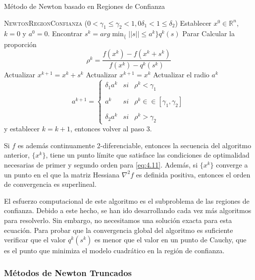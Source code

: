\begin{algorithm}[H]
\caption{Método de Newton basado en Regiones de Confianza}\label{alg:TrustRegionNewton}
\begin{algorithmic}[1]
\Procedure \textsc{NewtonRegionConfianza} ($0<\gamma_1\leq\gamma_2<1, 0 \delta_1 < 1 \leq\delta_2$)
\State Establecer $x^0\in\mathbb{R}^n$, $k=0$ y $a^0=0$.
\State Encontrar $s^k = arg \min_\{||s||\leq a^k\}q^k(s)$
	\State Parar
\Else
	\State Calcular la proporción \begin{equation*}
	\rho^k = \dfrac{f(x^k)-f(x^k+s^k)}{f(x^k)-q^k(s^k)}
	\end{equation*}
		\State Actualizar $x^{k+1}=x^k + s^k$
	\Else
		\State Actualizar $x^{k+1} = x^k$
	\EndIf
	\State Actualizar el radio $a^k$
	\begin{equation*}
	a^{k+1} = \left\{ \begin{array}{lcc}
             \delta_1a^k &   si  & \rho^k < \gamma_1 \\
             \\ a^k &  si & \rho^k\in\in [\gamma_1,\gamma_2] \\
             \\ \delta_2a^k & si & \rho^k > \gamma_2
             \end{array}
   \right.
	\end{equation*}
	y establecer $k=k+1$, entonces volver al paso 3.
\EndIf
\EndProcedure
\end{algorithmic}
\end{algorithm}

Si $f$ es además continuamente 2-diferenciable, entonces la secuencia del algoritmo anterior, $\{x^k\}$, tiene un punto límite que satisface las condiciones de optimalidad necesarias de primer y segundo orden para \ref{eq:4.11}. 
Además, si $\{x^k\}$ converge a un punto en el que la matriz Hessiana $\nabla^2f$ es definida positiva, entonces el orden de convergencia es superlineal. 

El esfuerzo computacional de este algoritmo es el subproblema de las regiones de confianza. 
Debido a este hecho, se han ido desarrollando cada vez más algoritmos para resolverlo. 
Sin embargo, no necesitamos una solución exacta para esta ecuación. 
Para probar que la convergencia global del algoritmo es suficiente verificar que el valor $q^k(s^k)$ es menor que el valor en un punto de Cauchy, que es el punto que minimiza el modelo cuadrático en la región de confianza.

\subsubsection{Métodos de Newton Truncados}

